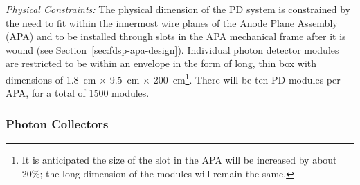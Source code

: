 
\emph{Physical Constraints:} The physical dimension of the PD system is constrained by the need to fit within the innermost wire planes of the Anode Plane Assembly (APA) and to be installed through slots in the APA mechanical frame after it is wound (see Section~\ref{sec:fdsp-apa-design}). 
Individual photon detector modules are restricted to be within an envelope in the form of long, thin box with dimensions of \SI{1.8}{cm} $\times$ \SI{9.5}{cm} $\times$ \SI{200}{cm}\footnote{It is anticipated the size of the slot in the APA will be increased by about 20\%; the long dimension of the modules will remain the same.}. There will be ten PD modules per APA, for a total of \num{1500} modules.



\subsubsection{Photon Collectors} 

